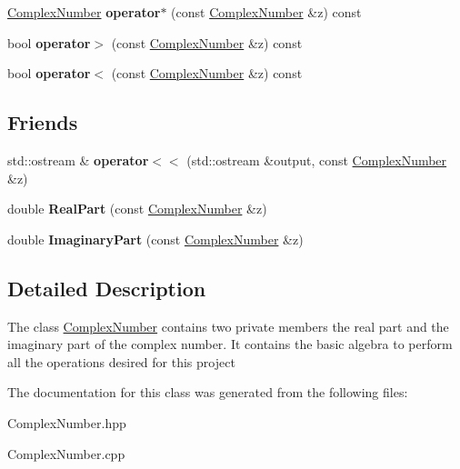 \begin{DoxyCompactItemize}
\item 
\mbox{\label{class_complex_number_a7134536ba0e91c67c98c91fa3e46ac1f}} 
\hyperlink{class_complex_number}{Complex\+Number} {\bfseries operator$\ast$} (const \hyperlink{class_complex_number}{Complex\+Number} \&z) const
\item 
\mbox{\label{class_complex_number_ad5286e63745428e443f20a3fe4c41dc6}} 
bool {\bfseries operator$>$} (const \hyperlink{class_complex_number}{Complex\+Number} \&z) const
\item 
\mbox{\label{class_complex_number_a109c83599836c2590a722ef632ee6918}} 
bool {\bfseries operator$<$} (const \hyperlink{class_complex_number}{Complex\+Number} \&z) const
\end{DoxyCompactItemize}
\subsection*{Friends}
\begin{DoxyCompactItemize}
\item 
\mbox{\label{class_complex_number_a8c7adda75cab62a2d6d3a9ec73fa420e}} 
std\+::ostream \& {\bfseries operator$<$$<$} (std\+::ostream \&output, const \hyperlink{class_complex_number}{Complex\+Number} \&z)
\item 
\mbox{\label{class_complex_number_a3535de0d1bdf6a1b107d1a39b233cc88}} 
double {\bfseries Real\+Part} (const \hyperlink{class_complex_number}{Complex\+Number} \&z)
\item 
\mbox{\label{class_complex_number_a97cb10a13c288a75e3830acbcc52028d}} 
double {\bfseries Imaginary\+Part} (const \hyperlink{class_complex_number}{Complex\+Number} \&z)
\end{DoxyCompactItemize}


\subsection{Detailed Description}
The class \hyperlink{class_complex_number}{Complex\+Number} contains two private members the real part and the imaginary part of the complex number. It contains the basic algebra to perform all the operations desired for this project 

The documentation for this class was generated from the following files\+:\begin{DoxyCompactItemize}
\item 
Complex\+Number.\+hpp\item 
Complex\+Number.\+cpp\end{DoxyCompactItemize}
